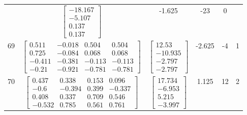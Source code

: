 \documentclass[a4paper,12pt]{article}
\begin{document}
\begin{tabular}{c c c c c c}
&
$\begin{bmatrix} -18.167 \\ -5.107 \\ 0.137 \\ 0.137 \end{bmatrix}$
&
-1.625
&
-23
&
0
\\
69
&
$\begin{bmatrix} 0.511 & -0.018 & 0.504 & 0.504 \\ 0.725 & -0.084 & 0.068 & 0.068 \\ -0.411 & -0.381 & -0.113 & -0.113 \\ -0.21 & -0.921 & -0.781 & -0.781 \end{bmatrix}$
&
$\begin{bmatrix} 12.53 \\ -10.935 \\ -2.797 \\ -2.797 \end{bmatrix}$
&
-2.625
&
-4
&
1
\\
70
&
$\begin{bmatrix} 0.437 & 0.338 & 0.153 & 0.096 \\ -0.6 & -0.394 & 0.399 & -0.337 \\ 0.408 & 0.337 & 0.709 & 0.546 \\ -0.532 & 0.785 & 0.561 & 0.761 \end{bmatrix}$
&
$\begin{bmatrix} 17.734 \\ -6.953 \\ 5.215 \\ -3.997 \end{bmatrix}$
&
1.125
&
12
&
2
\\
\end{tabular} \egroup \newpage
\end{document}
